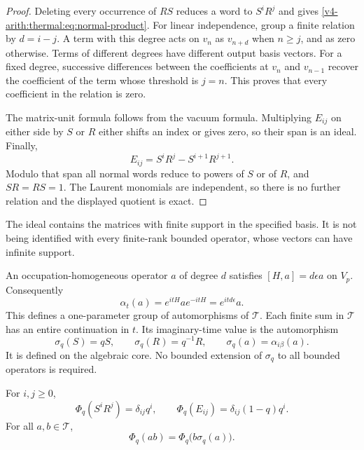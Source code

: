\begin{proof}
Deleting every occurrence of $RS$ reduces a word to $S^iR^j$ and
gives \eqref{v4-arith:thermal:eq:normal-product}. For linear independence, group a
finite relation by $d=i-j$. A term with this degree acts on $v_n$
as $v_{n+d}$ when $n\geq j$, and as zero otherwise. Terms of
different degrees have different output basis vectors. For a fixed
degree, successive differences between the coefficients at $v_n$
and $v_{n-1}$ recover the coefficient of the term whose threshold
is $j=n$. This proves that every coefficient in the relation is zero.

The matrix-unit formula follows from the vacuum formula. Multiplying
$E_{ij}$ on either side by $S$ or $R$ either shifts an index or gives
zero, so their span is an ideal. Finally,
\[
 E_{ij}=S^iR^j-S^{i+1}R^{j+1}.
\]
Modulo that span all normal words reduce to powers of $S$ or of
$R$, and $SR=RS=1$. The Laurent monomials are independent, so
there is no further relation and the displayed quotient is exact.
\end{proof}

The ideal contains the matrices with finite support in the specified
basis. It is not being identified with every finite-rank bounded
operator, whose vectors can have infinite support.

An occupation-homogeneous operator $a$ of degree $d$ satisfies
$[H,a]=d\epsilon a$ on $V_p$. Consequently
\[
 \alpha_t(a)=e^{itH}ae^{-itH}=e^{itd\epsilon}a.
\]
This defines a one-parameter group of automorphisms of $\mathcal T$.
Each finite sum in $\mathcal T$ has an entire continuation in $t$.
Its imaginary-time value is the automorphism
\begin{equation}
 \sigma_q(S)=qS,\qquad \sigma_q(R)=q^{-1}R,
 \qquad \sigma_q(a)=\alpha_{i\beta}(a).
 \label{v4-arith:thermal:eq:twist}
\end{equation}
It is defined on the algebraic core. No bounded extension of
$\sigma_q$ to all bounded operators is required.

\begin{proposition}
\label{v4-arith:thermal:prop:thermal-values}
For $i,j\geq0$,
\begin{equation}
 \Phi_q(S^iR^j)=\delta_{ij}q^i,
 \qquad
 \Phi_q(E_{ij})=\delta_{ij}(1-q)q^i.
 \label{v4-arith:thermal:eq:thermal-normal-values}
\end{equation}
For all $a,b\in\mathcal T$,
\begin{equation}
 \Phi_q(ab)=\Phi_q\bigl(b\sigma_q(a)\bigr).
 \label{v4-arith:thermal:eq:twisted-trace}
\end{equation}
\end{proposition}

